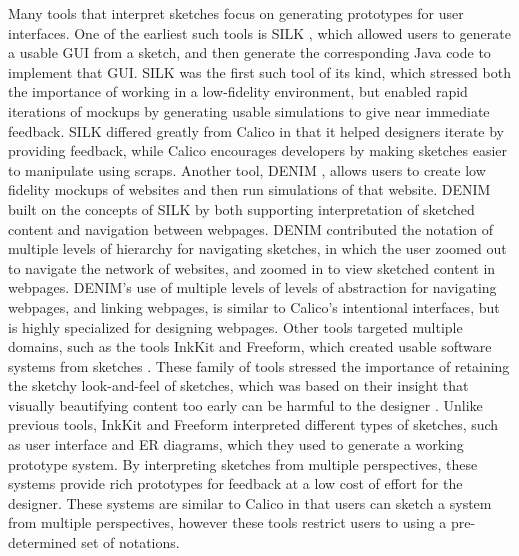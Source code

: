 Many tools that interpret sketches focus on generating prototypes for user interfaces. One of the earliest  such tools is SILK \citep{Landay}, which allowed users to generate a usable GUI from a sketch, and then generate the corresponding Java code to implement that GUI. SILK was the first such tool of its kind, which stressed both the importance of working in a low-fidelity environment, but enabled rapid iterations of mockups by generating usable simulations to give near immediate feedback. SILK differed greatly from Calico in that it helped designers iterate by providing feedback, while Calico encourages developers by making sketches easier to manipulate using scraps. Another tool, DENIM \citep{newman2003denim}, allows users to create low fidelity mockups of websites and then run simulations of that website. DENIM built on the concepts of SILK by both supporting interpretation of sketched content and navigation between webpages. DENIM contributed the notation of multiple levels of hierarchy for navigating sketches, in which the user zoomed out to navigate the network of websites, and zoomed in to view sketched content in webpages. DENIM's use of multiple levels of levels of abstraction for navigating webpages, and linking webpages, is similar to Calico's intentional interfaces, but is highly specialized for designing webpages. Other tools targeted multiple domains, such as the tools InkKit and Freeform, which created usable software systems from sketches \citep{chung2005inkkit,Plimmer}. These family of tools stressed the importance of retaining the sketchy look-and-feel of sketches, which was based on their insight that visually beautifying content too early can be harmful to the designer \citep{Shipman}. Unlike previous tools, InkKit and Freeform interpreted different types of sketches, such as user interface and ER diagrams, which they used to generate a working prototype system. By interpreting sketches from multiple perspectives, these systems provide rich prototypes for feedback at a low cost of effort for the designer. These systems are similar to Calico in that users can sketch a system from multiple perspectives, however these tools restrict users to using a pre-determined set of notations.

